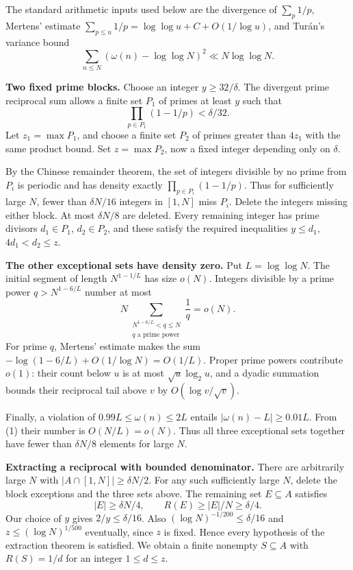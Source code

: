 The standard arithmetic inputs used below are the divergence of $\sum_p1/p$, Mertens' estimate $\sum_{p\leq u}1/p=\log\log u+C+O(1/\log u)$, and Tur\'an's variance bound
\[
\sum_{n\leq N}(\omega(n)-\log\log N)^2\ll N\log\log N.
\tag{1}
\]

\textbf{Two fixed prime blocks.} Choose an integer $y\geq32/\delta$. The divergent prime reciprocal sum allows a finite set $P_1$ of primes at least $y$ such that
\[
\prod_{p\in P_1}(1-1/p)<\delta/32.
\]
Let $z_1=\max P_1$, and choose a finite set $P_2$ of primes greater than $4z_1$ with the same product bound. Set $z=\max P_2$, now a fixed integer depending only on $\delta$.

By the Chinese remainder theorem, the set of integers divisible by no prime from $P_i$ is periodic and has density exactly $\prod_{p\in P_i}(1-1/p)$. Thus for sufficiently large $N$, fewer than $\delta N/16$ integers in $[1,N]$ miss $P_i$. Delete the integers missing either block. At most $\delta N/8$ are deleted. Every remaining integer has prime divisors $d_1\in P_1$, $d_2\in P_2$, and these satisfy the required inequalities $y\leq d_1$, $4d_1<d_2\leq z$.

\textbf{The other exceptional sets have density zero.} Put $L=\log\log N$. The initial segment of length $N^{1-1/L}$ has size $o(N)$. Integers divisible by a prime power $q>N^{1-6/L}$ number at most
\[
N\sum_{\substack{N^{1-6/L}<q\leq N\\q\text{ a prime power}}}\frac1q=o(N).
\tag{2}
\]
For prime $q$, Mertens' estimate makes the sum $-\log(1-6/L)+O(1/\log N)=O(1/L)$. Proper prime powers contribute $o(1)$: their count below $u$ is at most $\sqrt u\log_2u$, and a dyadic summation bounds their reciprocal tail above $v$ by $O(\log v/\sqrt v)$.

Finally, a violation of $0.99L\leq\omega(n)\leq2L$ entails $|\omega(n)-L|\geq0.01L$. From (1) their number is $O(N/L)=o(N)$. Thus all three exceptional sets together have fewer than $\delta N/8$ elements for large $N$.

\textbf{Extracting a reciprocal with bounded denominator.} There are arbitrarily large $N$ with $|A\cap[1,N]|\geq\delta N/2$. For any such sufficiently large $N$, delete the block exceptions and the three sets above. The remaining set $E\subseteq A$ satisfies
\[
|E|\geq\delta N/4,\qquad R(E)\geq |E|/N\geq\delta/4.
\]
Our choice of $y$ gives $2/y\leq\delta/16$. Also $(\log N)^{-1/200}\leq\delta/16$ and $z\leq(\log N)^{1/500}$ eventually, since $z$ is fixed. Hence every hypothesis of the extraction theorem is satisfied. We obtain a finite nonempty $S\subseteq A$ with $R(S)=1/d$ for an integer $1\leq d\leq z$.

